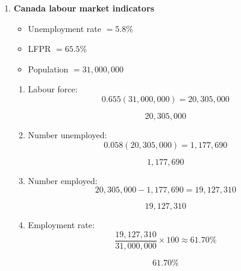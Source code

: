 \documentclass[12pt]{article}
\begin{document}
\begin{enumerate}[label=\textbf{Question \arabic*.}]

\item \textbf{Canada labour market indicators}

\begin{itemize}
    \item Unemployment rate \(=5.8\%\)
    \item LFPR \(=65.5\%\)
    \item Population \(=31{,}000{,}000\)
\end{itemize}

\begin{enumerate}[label=(\alph*)]
    \item Labour force:
    \[
    0.655(31{,}000{,}000)=20{,}305{,}000
    \]

    \[
    \boxed{20{,}305{,}000}
    \]

    \item Number unemployed:
    \[
    0.058(20{,}305{,}000)=1{,}177{,}690
    \]

    \[
    \boxed{1{,}177{,}690}
    \]

    \item Number employed:
    \[
    20{,}305{,}000-1{,}177{,}690=19{,}127{,}310
    \]

    \[
    \boxed{19{,}127{,}310}
    \]

    \item Employment rate:
    \[
    \frac{19{,}127{,}310}{31{,}000{,}000}\times 100 \approx 61.70\%
    \]

    \[
    \boxed{61.70\%}
    \]
\end{enumerate}

\end{enumerate}
\end{document}
